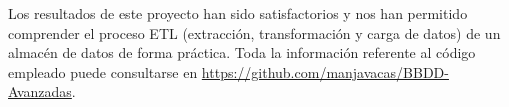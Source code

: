 \documentclass[11pt,a4paper]{article}
\begin{document}
Los resultados de este proyecto han sido satisfactorios y nos han permitido comprender el proceso ETL (extracción, transformación y carga de datos) de un almacén de datos de forma práctica. Toda la información referente al código empleado puede consultarse en \url{https://github.com/manjavacas/BBDD-Avanzadas}.
\end{document}

